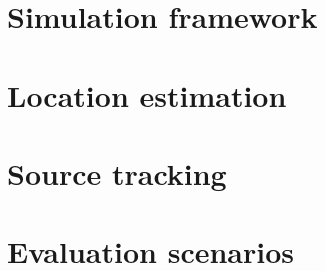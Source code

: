 \section{Simulation framework}
\section{Location estimation}
\section{Source tracking}
\section{Evaluation scenarios}